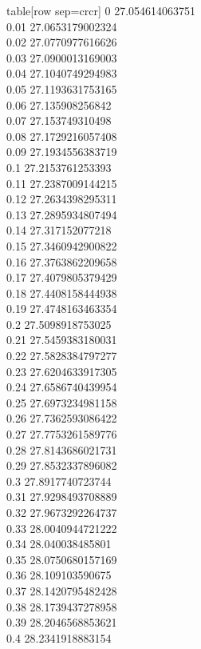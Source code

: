   table[row sep=crcr]{%
0	27.054614063751\\
0.01	27.0653179002324\\
0.02	27.0770977616626\\
0.03	27.0900013169003\\
0.04	27.1040749294983\\
0.05	27.1193631753165\\
0.06	27.135908256842\\
0.07	27.153749310498\\
0.08	27.1729216057408\\
0.09	27.1934556383719\\
0.1	27.2153761253393\\
0.11	27.2387009144215\\
0.12	27.2634398295311\\
0.13	27.2895934807494\\
0.14	27.317152077218\\
0.15	27.3460942900822\\
0.16	27.3763862209658\\
0.17	27.4079805379429\\
0.18	27.4408158444938\\
0.19	27.4748163463354\\
0.2	27.5098918753025\\
0.21	27.5459383180031\\
0.22	27.5828384797277\\
0.23	27.6204633917305\\
0.24	27.6586740439954\\
0.25	27.6973234981158\\
0.26	27.7362593086422\\
0.27	27.7753261589776\\
0.28	27.8143686021731\\
0.29	27.8532337896082\\
0.3	27.8917740723744\\
0.31	27.9298493708889\\
0.32	27.9673292264737\\
0.33	28.0040944721222\\
0.34	28.040038485801\\
0.35	28.0750680157169\\
0.36	28.109103590675\\
0.37	28.1420795482428\\
0.38	28.1739437278958\\
0.39	28.2046568853621\\
0.4	28.2341918883154\\
}
